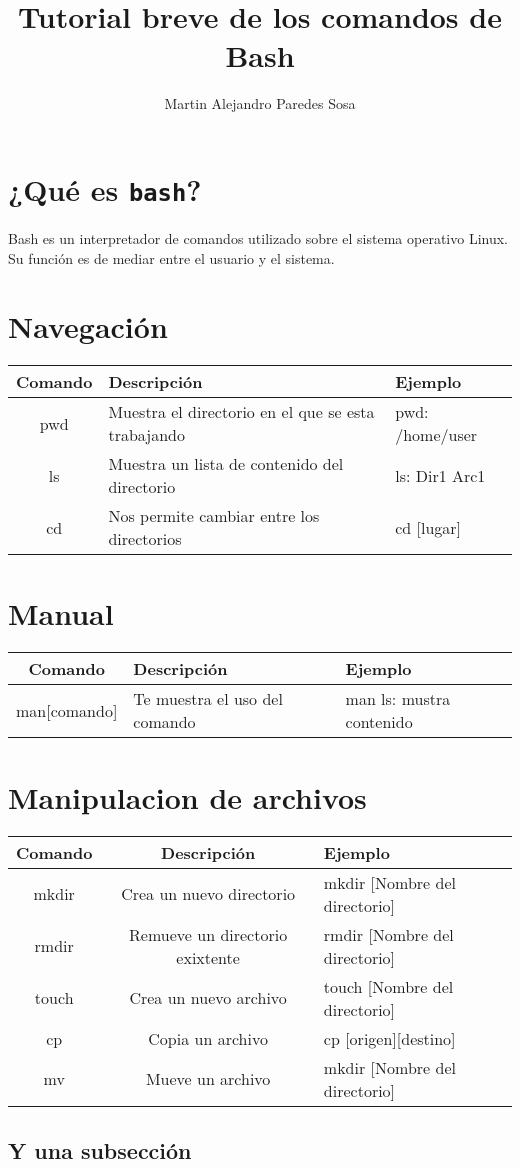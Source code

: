 \documentclass[12pt]{article}
\title{Tutorial breve de los comandos de Bash}
\author{Martin Alejandro Paredes Sosa}
\begin{document}
\maketitle

\section{¿Qué es {\tt bash}?}

Bash es un interpretador de comandos utilizado sobre el sistema operativo Linux.
Su función es de mediar entre el usuario y el sistema.

\section{Navegación}

\begin{tabular}{|c|l|l|}
\hline
Comando & Descripción & Ejemplo \\
\hline
pwd & Muestra el directorio en el que se esta trabajando & pwd:  /home/user\\ \hline
ls & Muestra un lista de contenido del directorio & ls: Dir1 Arc1\\ \hline
cd & Nos permite cambiar entre los directorios & cd [lugar] \\
\hline
\end{tabular} 


\section{Manual}

\begin{tabular}{|c|l|l|}
\hline
Comando & Descripción & Ejemplo \\
\hline
man[comando] & Te muestra el uso del comando & man ls: mustra contenido\\ \hline
\end{tabular} 

\section{Manipulacion de archivos}
\begin{tabular}{|c|c|l|}
\hline Comando & Descripción & Ejemplo \\ \hline
mkdir & Crea un nuevo directorio & mkdir [Nombre del directorio] \\ \hline
rmdir & Remueve un directorio exixtente & rmdir [Nombre del directorio] \\ \hline
touch & Crea un nuevo archivo & touch [Nombre del directorio] \\ \hline
cp & Copia un archivo & cp [origen][destino] \\ \hline
mv & Mueve un archivo & mkdir [Nombre del directorio] \\ \hline

\end{tabular}
\subsection{Y una subsección}


\end{document}

